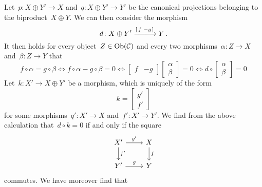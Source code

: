 \section{}

Let~$p \colon X \oplus Y' \to X$ and~$q \colon X \oplus Y' \to Y'$ be the canonical projections belonging to the biproduct~$X \oplus Y$.
We can then consider the morphism
\[
    d
  \colon
    X \oplus Y'
  \xlongto{\begin{bsmallmatrix} f & -g \end{bsmallmatrix}}
    Y \,.
\]
It then holds for every object~$Z \in \operatorname{Ob}(\mathcal{C})$ and every two morphisms~$\alpha \colon Z \to X$ and~$\beta \colon Z \to Y$ that
\[
        f \circ \alpha = g \circ \beta
  \iff  f \circ \alpha - g \circ \beta = 0
  \iff  \begin{bmatrix}
          f & -g
        \end{bmatrix}
        \begin{bmatrix}
          \alpha  \\
          \beta
        \end{bmatrix}
        = 0
  \iff  d
        \circ
        \begin{bmatrix}
          \alpha  \\
          \beta
        \end{bmatrix}
        = 0
\]
Let~$k \colon X' \to X \oplus Y'$ be a morphism, which is uniquely of the form
\[
    k
  = \begin{bmatrix}
      g'  \\
      f'
    \end{bmatrix}
\]
for some morphisms~$q' \colon X' \to X$ and~$f' \colon X' \to Y'$.
We find from the above calculation that~$d \circ k = 0$ if and only if the square
\[
  \begin{tikzcd}
      X'
      \arrow{r}[above]{g'}
      \arrow{d}[right]{f'}
    & X
      \arrow{d}[right]{f}
    \\
      Y'
      \arrow{r}[above]{g}
    & Y
  \end{tikzcd}
\]
commutes.
We have moreover find that
